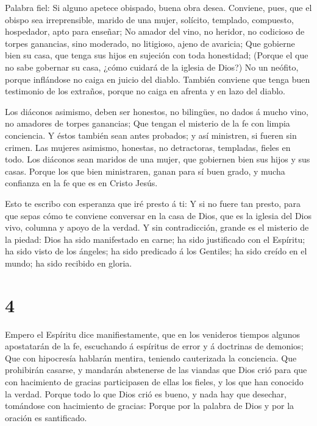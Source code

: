  Palabra fiel: Si alguno apetece obispado, buena obra desea.
 Conviene, pues, que el obispo sea irreprensible, marido de
una mujer, solícito, templado, compuesto, hospedador, apto para enseñar;
 No amador del vino, no heridor, no codicioso de torpes
ganancias, sino moderado, no litigioso, ajeno de avaricia; 
Que gobierne bien su casa, que tenga sus hijos en sujeción con toda
honestidad;  (Porque el que no sabe gobernar su casa, ¿cómo
cuidará de la iglesia de Dios?)  No un neófito, porque
inflándose no caiga en juicio del diablo.  También conviene
que tenga buen testimonio de los extraños, porque no caiga en afrenta y
en lazo del diablo.

 Los diáconos asimismo, deben ser honestos, no bilingües, no
dados á mucho vino, no amadores de torpes ganancias;  Que
tengan el misterio de la fe con limpia conciencia.  Y éstos
también sean antes probados; y así ministren, si fueren sin crimen.
 Las mujeres asimismo, honestas, no detractoras, templadas,
fieles en todo.  Los diáconos sean maridos de una mujer,
que gobiernen bien sus hijos y sus casas.  Porque los que
bien ministraren, ganan para sí buen grado, y mucha confianza en la fe
que es en Cristo Jesús.

 Esto te escribo con esperanza que iré presto á ti:
 Y si no fuere tan presto, para que sepas cómo te conviene
conversar en la casa de Dios, que es la iglesia del Dios vivo, columna y
apoyo de la verdad.  Y sin contradicción, grande es el
misterio de la piedad: Dios ha sido manifestado en carne; ha sido
justificado con el Espíritu; ha sido visto de los ángeles; ha sido
predicado á los Gentiles; ha sido creído en el mundo; ha sido recibido
en gloria.

\hypertarget{section-3}{%
\section{4}\label{section-3}}

 Empero el Espíritu dice manifiestamente, que en los
venideros tiempos algunos apostatarán de la fe, escuchando á espíritus
de error y á doctrinas de demonios;  Que con hipocresía
hablarán mentira, teniendo cauterizada la conciencia.  Que
prohibirán casarse, y mandarán abstenerse de las viandas que Dios crió
para que con hacimiento de gracias participasen de ellas los fieles, y
los que han conocido la verdad.  Porque todo lo que Dios
crió es bueno, y nada hay que desechar, tomándose con hacimiento de
gracias:  Porque por la palabra de Dios y por la oración es
santificado.

